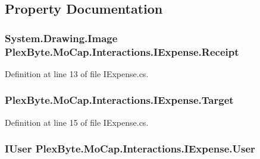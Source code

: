 \subsection{Property Documentation}
\subsubsection[{\texorpdfstring{Receipt}{Receipt}}]{\setlength{\rightskip}{0pt plus 5cm}System.\+Drawing.\+Image Plex\+Byte.\+Mo\+Cap.\+Interactions.\+I\+Expense.\+Receipt\hspace{0.3cm}{\ttfamily [get]}}\hypertarget{interface_plex_byte_1_1_mo_cap_1_1_interactions_1_1_i_expense_a164199a26cd05415a6075b64a428d64f}{}\label{interface_plex_byte_1_1_mo_cap_1_1_interactions_1_1_i_expense_a164199a26cd05415a6075b64a428d64f}


Definition at line 13 of file I\+Expense.\+cs.

\subsubsection[{\texorpdfstring{Target}{Target}}]{ Plex\+Byte.\+Mo\+Cap.\+Interactions.\+I\+Expense.\+Target\hspace{0.3cm}{\ttfamily [get]}}\hypertarget{interface_plex_byte_1_1_mo_cap_1_1_interactions_1_1_i_expense_ad33b05045db2c97941e9e16ae6e643f5}{}\label{interface_plex_byte_1_1_mo_cap_1_1_interactions_1_1_i_expense_ad33b05045db2c97941e9e16ae6e643f5}


Definition at line 15 of file I\+Expense.\+cs.

\subsubsection[{\texorpdfstring{User}{User}}]{\setlength{\rightskip}{0pt plus 5cm}I\+User Plex\+Byte.\+Mo\+Cap.\+Interactions.\+I\+Expense.\+User\hspace{0.3cm}{\ttfamily [get]}}\hypertarget{interface_plex_byte_1_1_mo_cap_1_1_interactions_1_1_i_expense_a3982207fd0c476dae28597cd163de03d}{}\label{interface_plex_byte_1_1_mo_cap_1_1_interactions_1_1_i_expense_a3982207fd0c476dae28597cd163de03d}


